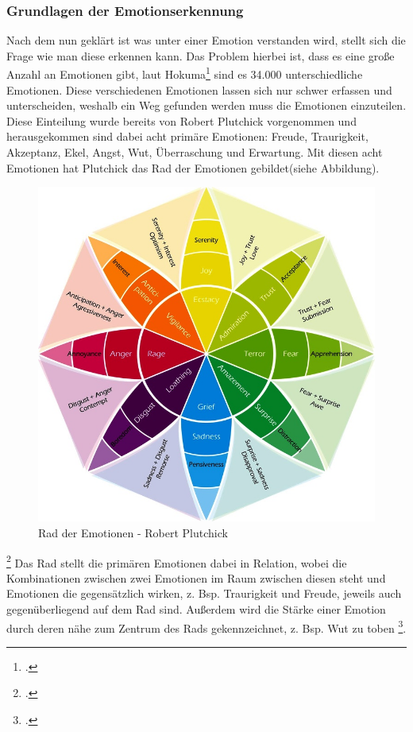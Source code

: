 \subsubsection{Grundlagen der Emotionserkennung}
Nach dem nun geklärt ist was unter einer Emotion verstanden wird, stellt sich die Frage wie man diese erkennen kann. Das Problem hierbei ist, dass es eine große Anzahl an Emotionen gibt, laut Hokuma\footcite[Vgl.][Absch. 1]{Hok17} sind es 34.000 unterschiedliche Emotionen. Diese verschiedenen Emotionen lassen sich nur schwer erfassen und unterscheiden, weshalb ein Weg gefunden werden muss die Emotionen einzuteilen. Diese Einteilung wurde bereits von Robert Plutchick vorgenommen und herausgekommen sind dabei acht primäre Emotionen: Freude, Traurigkeit, Akzeptanz, Ekel, Angst, Wut, Überraschung und Erwartung.\newline
Mit diesen acht Emotionen hat Plutchick das Rad der Emotionen gebildet(siehe Abbildung).
\begin{figure}[h]
	\centering
	\includegraphics[width=16cm]{Bilder/wheel-of-emotions.png}
	\caption[Rad der Emotionen - Robert Plutchick]{Rad der Emotionen - Robert Plutchick\footnotemark}
\end{figure}%
\footcitetext[Vgl.][]{Hok17}
\newline
Das Rad stellt die primären Emotionen dabei in Relation, wobei die Kombinationen zwischen zwei Emotionen im Raum zwischen diesen steht und Emotionen die gegensätzlich wirken, z. Bsp. Traurigkeit und Freude, jeweils auch gegenüberliegend auf dem Rad sind. Außerdem wird die Stärke einer Emotion durch deren nähe zum Zentrum des Rads gekennzeichnet, z. Bsp. Wut zu toben \footcite[Vgl.][Absch. Elements of the Wheel]{Hok17}.\newline
